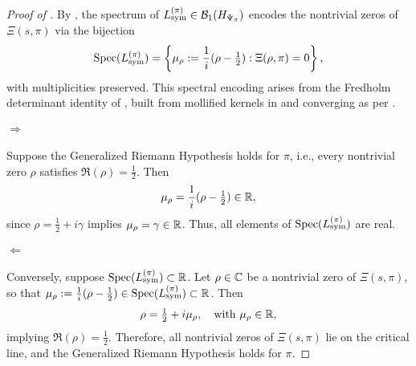 \begin{proof}[Proof of ]
By , the spectrum of \( L_{\mathrm{sym}}^{(\pi)} \in \mathcal{B}_1(H_{\Psi_{\pi}}) \) encodes the nontrivial zeros of \( \Xi(s, \pi) \) via the bijection
\[
\operatorname{Spec}(L_{\mathrm{sym}}^{(\pi)}) = \left\{ \mu_\rho := \frac{1}{i}(\rho - \tfrac{1}{2}) : \Xi(\rho, \pi) = 0 \right\},
\]
with multiplicities preserved. This spectral encoding arises from the Fredholm determinant identity of , built from mollified kernels in  and converging as per .

\paragraph{\( \Rightarrow \)} Suppose the Generalized Riemann Hypothesis holds for \( \pi \), i.e., every nontrivial zero \( \rho \) satisfies \( \Re(\rho) = \tfrac{1}{2} \). Then
\[
\mu_\rho = \frac{1}{i}(\rho - \tfrac{1}{2}) \in \mathbb{R},
\]
since \( \rho = \tfrac{1}{2} + i\gamma \) implies \( \mu_\rho = \gamma \in \mathbb{R} \). Thus, all elements of \( \operatorname{Spec}(L_{\mathrm{sym}}^{(\pi)}) \) are real.

\paragraph{\( \Leftarrow \)} Conversely, suppose \( \operatorname{Spec}(L_{\mathrm{sym}}^{(\pi)}) \subset \mathbb{R} \). Let \( \rho \in \mathbb{C} \) be a nontrivial zero of \( \Xi(s, \pi) \), so that \( \mu_\rho := \tfrac{1}{i}(\rho - \tfrac{1}{2}) \in \operatorname{Spec}(L_{\mathrm{sym}}^{(\pi)}) \subset \mathbb{R} \). Then
\[
\rho = \tfrac{1}{2} + i \mu_\rho, \quad \text{with } \mu_\rho \in \mathbb{R},
\]
implying \( \Re(\rho) = \tfrac{1}{2} \). Therefore, all nontrivial zeros of \( \Xi(s, \pi) \) lie on the critical line, and the Generalized Riemann Hypothesis holds for \( \pi \).
\end{proof}
